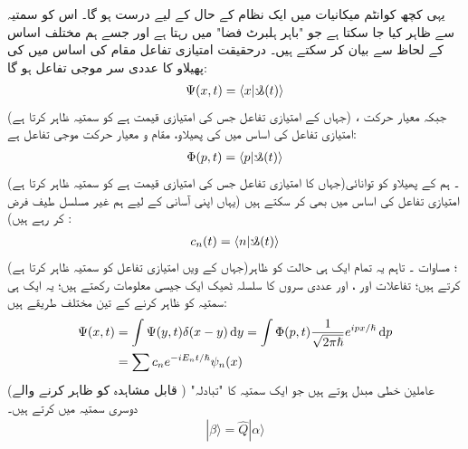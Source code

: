  یہی کچھ کوانٹم میکانیات میں ایک نظام کے حال کے لیے درست ہو گا۔ اس کو سمتیہ  سے ظاہر کیا جا سکتا ہے جو "باہر ہلبرٹ فضا" میں رہتا ہے اور جسے ہم مختلف اساس کے لحاظ سے بیان کر سکتے ہیں۔ درحقیقت امتیازی تفاعل مقام کی اساس میں  کی پھیلاو کا عددی سر موجی تفاعل  ہو گا:
\begin{align}
\Psi(x,t) = \langle x | \s(t) \rangle 
\end{align}
(جہاں  کے امتیازی تفاعل جس کی امتیازی قیمت  ہے کو سمتیہ  ظاہر کرتا ہے) ، جبکہ معیار حرکت امتیازی تفاعل کی اساس میں  کی پھیلاو، مقام و معیار حرکت موجی تفاعل  ہے:
\begin{align}
\Phi(p,t) = \langle p | \s (t) \rangle
\end{align}
(جہاں  کا امتیازی تفاعل جس کی امتیازی قیمت  ہے کو سمتیہ  ظاہر کرتا ہے)۔ ہم  کے پھیلاو کو توانائی امتیازی تفاعل کی اساس میں بھی کر سکتے ہیں (یہاں اپنی آسانی کے لیے ہم غیر مسلسل طیف فرض کر رہے ہیں) :
\begin{align}
c_{n} (t) = \langle n | \s (t) \rangle
\end{align}
(جہاں  کے  ویں امتیازی تفاعل کو سمتیہ  ظاہر کرتا ہے)؛ مساوات ۔ تاہم یہ تمام ایک ہی حالت کو ظاہر کرتے ہیں؛ تفاعلات  اور ، اور عددی سروں کا سلسلہ ٹھیک ایک جیسی معلومات رکھتے ہیں؛ یہ ایک ہی سمتیہ کو ظاہر کرنے کے تین مختلف طریقے ہیں:
\begin{align}
\Psi (x,t) &= \int \Psi(y,t) \delta (x-y) \dif y = \int \Phi (p,t) \frac{1}{\sqrt{2\pi\hslash}} e^{ipx/\hslash} \dif p \nonumber \\ 
&= \sum c_{n} e^{-iE_{n}t/\hslash} \psi_{n}(x)
\end{align}
(قابل مشاہدہ کو ظاہر کرنے والے ) عاملین خطی مبدل ہوتے ہیں جو ایک سمتیہ کا "تبادلہ" دوسری سمتیہ میں کرتے ہیں۔
\begin{align}\label{مساوات_قواعد_بیٹا_سمتیہ}
| \beta \rangle = \hat{Q}|\alpha \rangle
\end{align}
